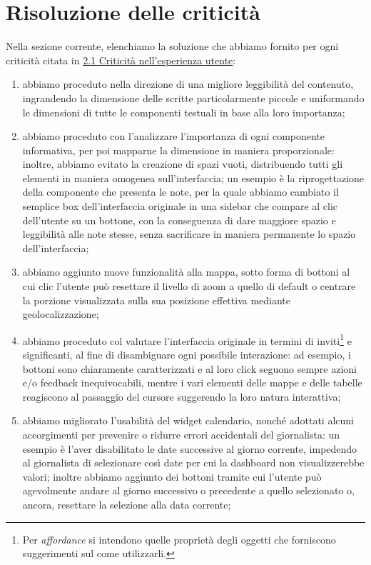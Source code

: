 \documentclass[../../main.tex]{subfiles}
\begin{document}
\section{Risoluzione delle criticità}
Nella sezione corrente, elenchiamo la soluzione che abbiamo fornito per ogni criticità citata in \hyperref[ss:criticita]{2.1 Criticità nell’esperienza utente}:
\begin{enumerate}
    \item [{\hyperref[el:1]{1.}}] abbiamo proceduto nella direzione di una migliore leggibilità del contenuto, ingrandendo la dimensione delle scritte particolarmente piccole e uniformando le dimensioni di tutte le componenti testuali in base alla loro importanza;
    \item [{\hyperref[el:2]{2.}}] abbiamo proceduto con l'analizzare l'importanza di ogni componente informativa, per poi mapparne la dimensione in maniera proporzionale: inoltre, abbiamo evitato la creazione di spazi vuoti, distribuendo tutti gli elementi in maniera omogenea sull'interfaccia; un esempio è la riprogettazione della componente che presenta le note, per la quale abbiamo cambiato il semplice box dell'interfaccia originale in una sidebar che compare al clic dell'utente su un bottone, con la conseguenza di dare maggiore spazio e leggibilità alle note stesse, senza sacrificare in maniera permanente lo spazio dell'interfaccia;
    \item [{\hyperref[el:3]{3.}}] abbiamo aggiunto nuove funzionalità alla mappa, sotto forma di bottoni al cui clic l'utente può resettare il livello di zoom a quello di default o centrare la porzione visualizzata sulla sua posizione effettiva mediante geolocalizzazione; 
    \item [{\hyperref[el:4]{4.}}] abbiamo proceduto col valutare l'interfaccia originale in termini di inviti\footnote{Per \textit{affordance} si intendono quelle proprietà degli oggetti che forniscono suggerimenti sul come utilizzarli.} e significanti, al fine di disambiguare ogni possibile interazione: ad esempio, i bottoni sono chiaramente caratterizzati e al loro click seguono sempre azioni e/o feedback inequivocabili, mentre i vari elementi delle mappe e delle tabelle reagiscono al passaggio del cursore suggerendo la loro natura interattiva;
    \item [{\hyperref[el:5]{5.}}] abbiamo migliorato l'usabilità del widget calendario, nonché adottati alcuni accorgimenti per prevenire o ridurre errori accidentali del giornalista: un esempio è l'aver disabilitato le date successive al giorno corrente, impedendo al giornalista di selezionare così date per cui la dashboard non visualizzerebbe valori; inoltre abbiamo aggiunto dei bottoni tramite cui l'utente può agevolmente andare al giorno successivo o precedente a quello selezionato o, ancora, resettare la selezione alla data corrente;

\end{enumerate}
\end{document}
